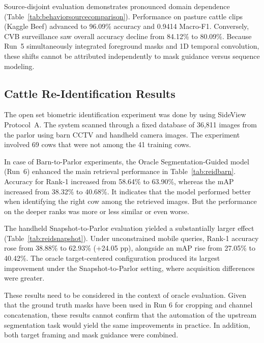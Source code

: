 

Source-disjoint evaluation demonstrates pronounced domain dependence (Table~\ref{tab:behaviorsourcecomparison}). Performance on pasture cattle clips (Kaggle Beef) advanced to 96.09\% accuracy and 0.9414 Macro-F1. Conversely, CVB surveillance saw overall accuracy decline from 84.12\% to 80.09\%. Because Run~5 simultaneously integrated foreground masks and 1D temporal convolution, these shifts cannot be attributed independently to mask guidance versus sequence modeling.

\subsection{Cattle Re-Identification Results}

The open set biometric identification experiment was done by using SideView Protocol~A. The system scanned through a fixed database of 36,811 images from the parlor using barn CCTV and handheld camera images. The experiment involved 69 cows that were not among the 41 training cows.



In case of Barn-to-Parlor experiments, the Oracle Segmentation-Guided model (Run~6) enhanced the main retrieval performance in Table~\ref{tab:reidbarn}. Accuracy for Rank-1 increased from 58.64\% to 63.90\%, whereas the mAP increased from 38.32\% to 40.68\%. It indicates that the model performed better when identifying the right cow among the retrieved images. But the performance on the deeper ranks was more or less similar or even worse.



The handheld Snapshot-to-Parlor evaluation yielded a substantially larger effect (Table~\ref{tab:reidsnapshot}). Under unconstrained mobile queries, Rank-1 accuracy rose from 38.88\% to 62.93\% (+24.05 pp), alongside an mAP rise from 27.05\% to 40.42\%. The oracle target-centered configuration produced its largest improvement under the Snapshot-to-Parlor setting, where acquisition differences were greater.

These results need to be considered in the context of oracle evaluation. Given that the ground truth masks have been used in Run 6 for cropping and channel concatenation, these results cannot confirm that the automation of the upstream segmentation task would yield the same improvements in practice. In addition, both target framing and mask guidance were combined.

